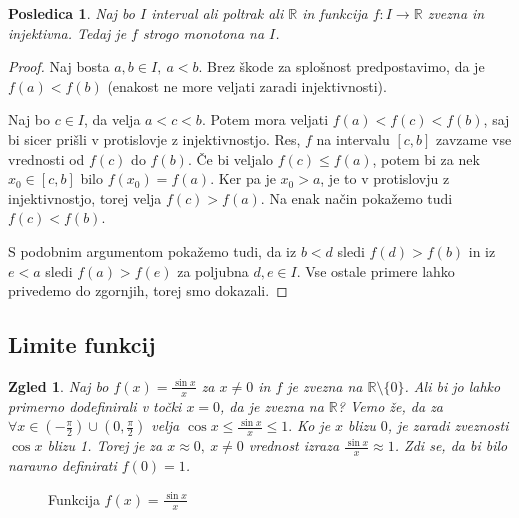 \documentclass[10pt, a4paper]{article}
\newtheorem{posledica}[izr]{Posledica}
\newtheorem{zgled}{Zgled}[section]
\newenvironment{noticeC}{%
  \tcolorbox[%
  notitle,
  empty,
  enhanced,  %
  breakable,
  coltext=black, 
  fontupper=\rmfamily,
  parbox=false,
  noparskip,
  sharp corners,
  boxrule=-1pt,  %
  frame hidden,
  left=7pt,  %
  right=7pt,
  top=5pt,
  bottom=5pt,
  before skip=2.5ex plus 2pt,
  after skip=2.5ex plus 2pt,
  overlay unbroken and last={%
  },
  ]}
{\endtcolorbox}
\newenvironment{dokaz}%
  {\begin{noticeC}\begin{proof}}%
  {\end{proof}\end{noticeC}}
\newcommand{\R}{\mathbb {R}}
\begin{document}
\begin{posledica}
    Naj bo $I$ interval ali poltrak ali $\R$ in funkcija $f: I \rightarrow \R$ zvezna in injektivna. Tedaj je $f$ strogo monotona na $I$.
\end{posledica}

\begin{dokaz}
    Naj bosta $a,b \in I,\ a<b$. Brez škode za splošnost predpostavimo, da je $f(a) < f(b)$ (enakost ne more veljati zaradi injektivnosti). 

        Naj bo $c \in I$, da velja $a < c < b$. Potem mora veljati $f(a) < f(c) < f(b)$, saj bi sicer prišli v protislovje z injektivnostjo. 
        Res, $f$ na intervalu $[c,b]$ zavzame vse vrednosti od $f(c)$ do $f(b)$. Če bi veljalo $f(c) \leq f(a)$, potem bi za nek $x_0 \in [c,b]$ bilo $f(x_0) = f(a)$. 
        Ker pa je $x_0 > a$, je to v protislovju z injektivnostjo, torej velja $f(c) > f(a)$.
        Na enak način pokažemo tudi $f(c) < f(b)$.
        
        S podobnim argumentom pokažemo tudi, da iz $b < d$ sledi $f(d) > f(b)$ in iz $e < a$ sledi $f(a) > f(e)$ za poljubna $d,e \in I$.
        Vse ostale primere lahko privedemo do zgornjih, torej smo dokazali.
\end{dokaz}

\subsection{Limite funkcij}

\begin{zgled}
    Naj bo $f(x) = \frac{\sin x}{x}$ za $x \neq 0$ in $f$ je zvezna na $\R \setminus \{0\}$. Ali bi jo lahko primerno dodefinirali v točki $x = 0$, da je zvezna na $\R$?
    Vemo že, da za $\forall x \in \left(-\frac{\pi}{2} \right) \cup \left(0, \frac{\pi}{2} \right)$ velja $\cos x \leq \frac{\sin x}{x} \leq 1.$ Ko je $x$ blizu $0$, je zaradi zveznosti $\cos x$ blizu 1. Torej je za $x \approx 0,\ x \neq 0$ vrednost izraza $\frac{\sin x}{x} \approx 1$.
    Zdi se, da bi bilo naravno definirati $f(0) = 1$.
\end{zgled}

\begin{figure}[hbt!]
    \centering
    \caption{Funkcija $f(x) = \frac{\sin{x}}{x}$}
\end{figure}
\end{document}
